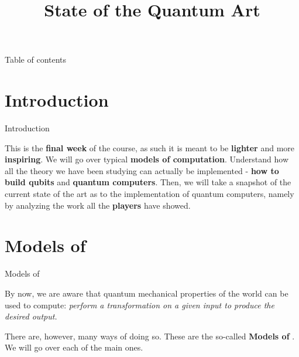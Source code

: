 \documentclass[aspectratio=43]{beamer}
\title{State of the Quantum Art}
\begin{document}
\begin{frame}
	\titlepage
\end{frame}


\begin{frame}{Table of contents}
	\begin{card}
		\tableofcontents
	\end{card}
\end{frame}

        

\section{Introduction}
\begin{frame}{Introduction}
    \begin{card}
        This is the \textbf{final week} of the course, as such it is meant to be \textbf{lighter} and more \textbf{inspiring}. We will go over typical \textbf{models of computation}. Understand how all the theory we have been studying can actually be implemented - \textbf{how to build qubits} and \textbf{quantum computers}. Then, we will take a snapshot of the current state of the art as to the implementation of quantum computers, namely by analyzing the work all the \textbf{players} have showed.
    \end{card}
\pagenumber
\end{frame}

\section{Models of \qcp}
\begin{frame}{Models of \qcp}
    \begin{card}
        By now, we are aware that quantum mechanical properties of the world can be used to compute: \textit{perform a transformation on a given input to produce the desired output.}
    \end{card}
    \begin{card}
        There are, however, many ways of doing so. These are the so-called \textbf{Models of \qcp}. We will go over each of the main ones.
    \end{card}
\pagenumber
\end{frame}
\end{document}
